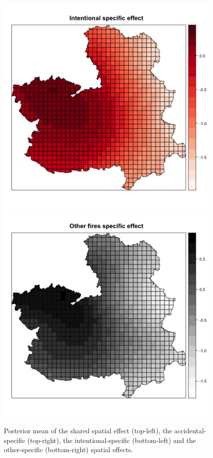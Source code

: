 \begin{figure}[h!]
\begin{center}
\includegraphics[scale=0.40]{images/CLMFires_int_specific.png}
\includegraphics[scale=0.40]{images/CLMFires_Other_specific.png}
\end{center}
\caption{Posterior mean of the shared spatial effect (top-left), the accidental-specific (top-right), the intentional-specific (bottom-left) and the other-specific (bottom-right) spatial effects.}
\label{fig:clmfires:est2}
\end{figure}


